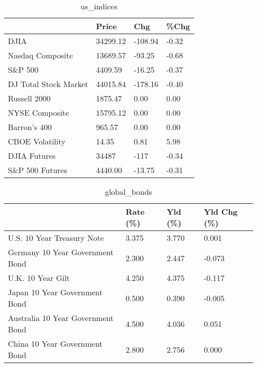 \documentclass{article}%
\begin{document}
%


\begin{table}[htbp]%
\caption{us\_indices}%
\centering%
\begin{adjustbox}{width=1\textwidth}%
\begin{tabular}{llll}
\toprule
                      &    Price &     Chg &  \%Chg \\
\midrule
                 DJIA & 34299.12 & -108.94 & -0.32 \\
     Nasdaq Composite & 13689.57 &  -93.25 & -0.68 \\
              S\&P 500 &  4409.59 &  -16.25 & -0.37 \\
DJ Total Stock Market & 44015.84 & -178.16 & -0.40 \\
         Russell 2000 &  1875.47 &    0.00 &  0.00 \\
       NYSE Composite & 15795.12 &    0.00 &  0.00 \\
         Barron's 400 &   965.57 &    0.00 &  0.00 \\
      CBOE Volatility &    14.35 &    0.81 &  5.98 \\
         DJIA Futures &    34487 &    -117 & -0.34 \\
      S\&P 500 Futures &  4440.00 &  -13.75 & -0.31 \\
\bottomrule
\end{tabular}
%
\end{adjustbox}%
\end{table}

%


\begin{table}[htbp]%
\caption{global\_bonds}%
\centering%
\begin{adjustbox}{width=1\textwidth}%
\begin{tabular}{llll}
\toprule
                                  & Rate (\%) & Yld (\%) & Yld Chg (\%) \\
\midrule
       U.S. 10 Year Treasury Note &    3.375 &   3.770 &       0.001 \\
  Germany 10 Year Government Bond &    2.300 &   2.447 &      -0.073 \\
                U.K. 10 Year Gilt &    4.250 &   4.375 &      -0.117 \\
    Japan 10 Year Government Bond &    0.500 &   0.390 &      -0.005 \\
Australia 10 Year Government Bond &    4.500 &   4.036 &       0.051 \\
    China 10 Year Government Bond &    2.800 &   2.756 &       0.000 \\
\bottomrule
\end{tabular}
%
\end{adjustbox}%
\end{table}
\end{document}
